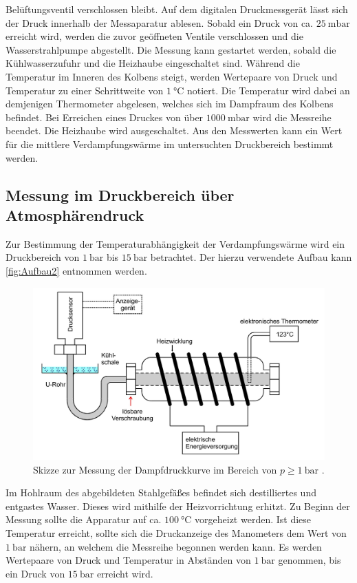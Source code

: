 Belüftungsventil verschlossen bleibt. Auf dem digitalen Druckmessgerät lässt sich der Druck innerhalb der Messaparatur ablesen. Sobald ein Druck von
ca. $\qty{25}{\milli\bar}$ erreicht wird, werden die zuvor geöffneten Ventile verschlossen und die Wasserstrahlpumpe abgestellt. Die Messung kann gestartet werden,
sobald die Kühlwasserzufuhr und die Heizhaube eingeschaltet sind. Während die Temperatur im Inneren des Kolbens steigt, werden Wertepaare von Druck und 
Temperatur zu einer Schrittweite von $\qty{1}{\degreeCelsius}$ notiert. Die Temperatur wird dabei an demjenigen Thermometer abgelesen, welches sich im Dampfraum des 
Kolbens befindet. Bei Erreichen eines Druckes von über $\qty{1000}{\milli\bar}$ wird die Messreihe beendet. Die Heizhaube wird ausgeschaltet. Aus den Messwerten kann
ein Wert für die mittlere Verdampfungswärme im untersuchten Druckbereich bestimmt werden.

\subsection{Messung im Druckbereich über Atmosphärendruck}
\label{subsec:D_Überdruck}
Zur Bestimmung der Temperaturabhängigkeit der Verdampfungswärme wird ein Druckbereich von $\qty{1}{\bar}$ bis $\qty{15}{\bar}$ betrachtet. Der hierzu verwendete Aufbau
kann \autoref{fig:Aufbau2} entnommen werden.

\begin{figure}
    \centering
    \includegraphics[width =.75\textwidth]{content/Aufbau2.jpg}
    \caption{Skizze zur Messung der Dampfdruckkurve im Bereich von $p \geq \qty{1}{\bar}$ \cite{v203}.}
    \label{fig:Aufbau2}
\end{figure}

Im Hohlraum des abgebildeten Stahlgefäßes befindet sich destilliertes und entgastes Wasser. Dieses wird mithilfe der Heizvorrichtung erhitzt. Zu Beginn der Messung 
sollte die Apparatur auf ca. $\qty{100}{\degreeCelsius}$ vorgeheizt werden. Ist diese Temperatur erreicht, sollte sich die Druckanzeige des Manometers dem Wert von
$\qty{1}{\bar}$ nähern, an welchem die Messreihe begonnen werden kann. Es werden Wertepaare von Druck und Temperatur in Abständen von $\qty{1}{\bar}$ genommen, bis ein 
Druck von $\qty{15}{\bar}$ erreicht wird. 
